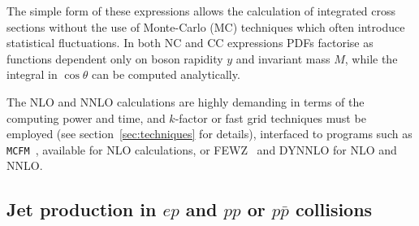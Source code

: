 The simple form of these expressions allows the calculation of integrated
cross sections without the use of Monte-Carlo (MC) techniques which often 
introduce statistical fluctuations.
In both NC and CC expressions PDFs
factorise as functions dependent only on boson rapidity \(y\) and
invariant mass \(M\), while
the integral in \(\cos\theta\) can be computed analytically.

The NLO and NNLO calculations are 
highly demanding
in terms of the computing power and time, and $k$-factor or fast grid techniques must be employed (see section~\ref{sec:techniques}
for details), interfaced to programs such as
\texttt{MCFM}~\cite{Campbell:1999ah,Campbell:2000je,Campbell:2010ff}, 
available for NLO calculations, or 
FEWZ~\cite{FEWZ} and DYNNLO \cite{DYNNLO} for NLO and NNLO.
 






\subsection{Jet production in $ep$ and $pp$ or $p \bar p$ collisions}
\label{jetsection}

